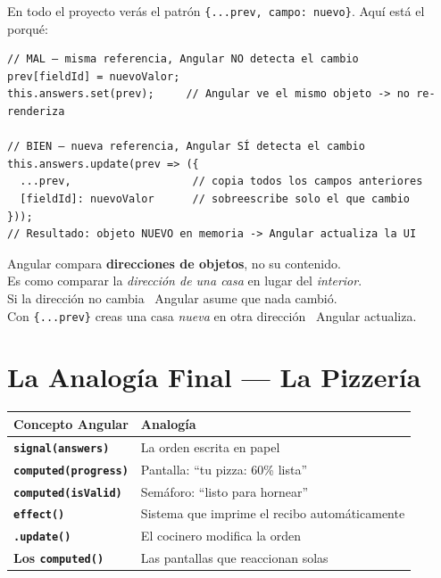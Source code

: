 \documentclass[12pt, a4paper]{article}
\begin{document}
En todo el proyecto verás el patrón \texttt{\{...prev, campo: nuevo\}}. Aquí está el porqué:

\begin{lstlisting}
// MAL — misma referencia, Angular NO detecta el cambio
prev[fieldId] = nuevoValor;
this.answers.set(prev);     // Angular ve el mismo objeto -> no re-renderiza

// BIEN — nueva referencia, Angular SÍ detecta el cambio
this.answers.update(prev => ({
  ...prev,                   // copia todos los campos anteriores
  [fieldId]: nuevoValor      // sobreescribe solo el que cambio
}));
// Resultado: objeto NUEVO en memoria -> Angular actualiza la UI
\end{lstlisting}

\begin{tcolorbox}[analogia, title={\emoji{house} Por Qué Importa la Referencia}]
  Angular compara \textbf{direcciones de objetos}, no su contenido.\\[0.2cm]
  Es como comparar la \textit{dirección de una casa} en lugar del \textit{interior}.\\
  Si la dirección no cambia \textrightarrow\ Angular asume que nada cambió.\\
  Con \texttt{\{...prev\}} creas una casa \textit{nueva} en otra dirección \textrightarrow\ Angular actualiza.
\end{tcolorbox}

\section{ La Analogía Final — La Pizzería}

\begin{center}
\renewcommand{\arraystretch}{1.6}
\begin{tabular}{>{\bfseries}p{5cm} p{7.5cm}}
\toprule
\textbf{Concepto Angular} & \textbf{Analogía} \\
\midrule
\texttt{signal(answers)} & La orden escrita en papel \\
\texttt{computed(progress)} & Pantalla: ``tu pizza: 60\% lista'' \\
\texttt{computed(isValid)} & Semáforo: ``listo para hornear'' \\
\texttt{effect()} & Sistema que imprime el recibo automáticamente \\
\texttt{.update()} & El cocinero modifica la orden \\
Los \texttt{computed()} & Las pantallas que reaccionan solas \\
\bottomrule
\end{tabular}
\end{center}
\end{document}
